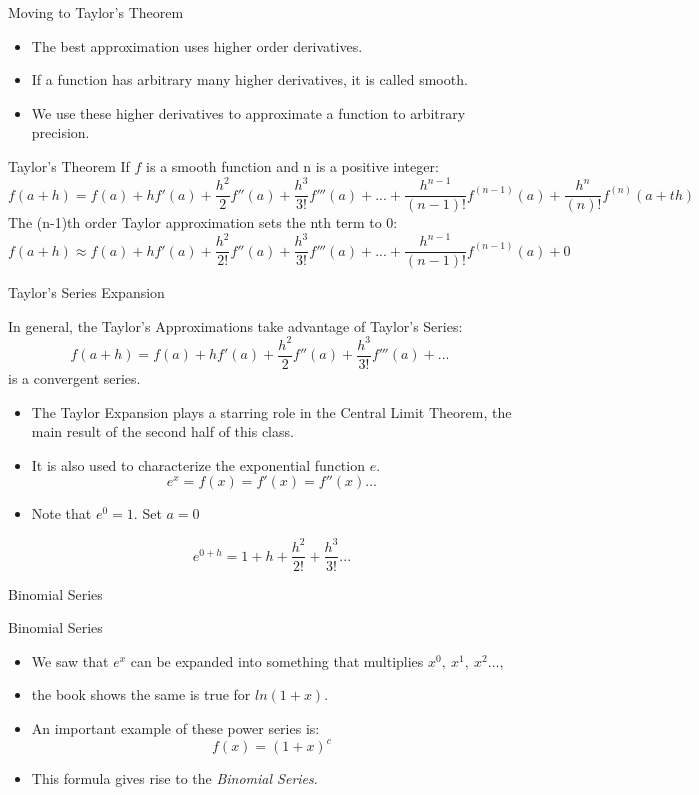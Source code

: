 \documentclass[aspectratio=169]{beamer}
\numberwithin{equation}{section}
\begin{document}
\begin{frame}{Moving to Taylor's Theorem}
\begin{itemize}
\item The best approximation uses higher order derivatives.\pause
\item If a function has arbitrary many higher derivatives, it is called smooth.  \pause
\item We use these higher derivatives to approximate a function to arbitrary precision.
\end{itemize} 
\end{frame}

\begin{frame}{Taylor's Theorem}
If $f$ is a smooth function and n is a positive integer:
{\scriptsize
$$f(a+h)=f(a)+hf'(a)+\frac{h^2}{2}f''(a)+\frac{h^3}{3!}f'''(a)+...+\frac{h^{n-1}}{(n-1)!}f^{(n-1)}(a)+\frac{h^{n}}{(n)!}f^{(n)}(a+th)$$\pause
}
The (n-1)th order Taylor approximation sets the nth term to 0:
$$f(a+h)\approx f(a)+hf'(a)+\frac{h^2}{2!}f''(a)+\frac{h^3}{3!}f'''(a)+...+\frac{h^{n-1}}{(n-1)!}f^{(n-1)}(a)+0$$
 

\end{frame}

\begin{frame}{Taylor's Series Expansion}

In general, the Taylor's Approximations take advantage of Taylor's Series:
$$f(a+h)=f(a)+hf'(a)+\frac{h^2}{2}f''(a)+\frac{h^3}{3!}f'''(a)+...$$
is a convergent series.\pause
\begin{itemize}
\item The Taylor Expansion plays a starring role in the Central Limit Theorem, the main result of the second half of this class.\pause
\item It is also used to characterize the exponential function $e$.\pause
$$e^x=f(x)=f'(x)=f''(x)...$$\pause
\item[] Note that $e^0=1$.  Set $a=0$\pause

$$e^{0+h}=1+h+\frac{h^2}{2!}+\frac{h^3}{3!}...$$

\end{itemize}

\end{frame}

\begin{frame}{Binomial Series}



\end{frame}


\begin{frame}{Binomial Series}
\begin{itemize}
\item We saw that $e^x$ can be expanded into something that multiplies $x^0,\ x^1,\ x^2 \ldots$, 
\item the book shows the same is true for $ln(1+x)$. 
\item An important example of these power series is:
$$f(x)=(1+x)^c$$
\item This formula gives rise to the \emph{Binomial Series}.
\end{itemize}
\end{frame}
\end{document}
